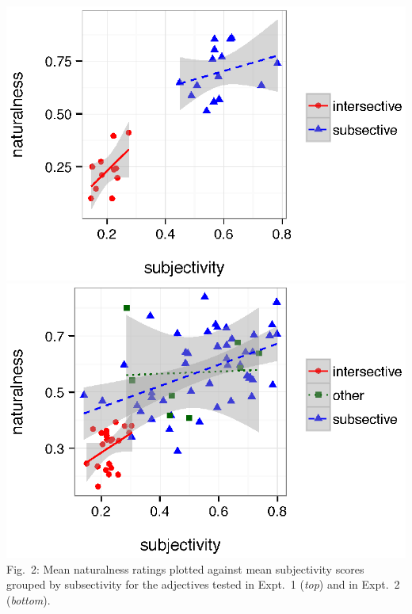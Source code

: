 \documentclass[10pt]{article}
\begin{document}
\begin{minipage}{.32\textwidth}
	\includegraphics[width=.95\linewidth]{plots/expt1-subjectivity-subsectivity.eps}\\\includegraphics[width=.95\linewidth]{plots/expt3-subjectivity-subsectivity.eps}
	Fig.~2: Mean naturalness ratings plotted against mean subjectivity scores grouped by subsectivity for the adjectives tested in Expt.~1 (\emph{top}) and in Expt.~2 (\emph{bottom}).
\end{minipage} 
\end{document}
